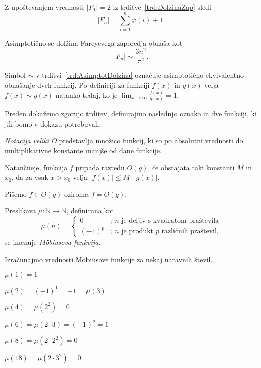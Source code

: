 \documentclass[mat1]{fmfdelo}
\begin{document}
\begin{opomba}
\label{op:AsimptotDolzina}
Z upoštevanjem vrednosti $|F_{1}| = 2$ iz trditve~\ref{trd:DolzinaZap} sledi \[  |F_{n}| = \sum_{i=1}^n \varphi(i) + 1. \]
\end{opomba}

\begin{trditev}
\label{trd:AsimptotDolzina}
Asimptotično se dolžina Fareyevega zaporedja obnaša kot
\[  |F_{n}|\sim\frac{3n^2}{\pi^2}. \]
\end{trditev}

\begin{opomba}
Simbol $\sim$ v trditvi~\ref{trd:AsimptotDolzina} označuje asimptotično ekvivalentno obnašanje dveh funkcij.
Po definiciji za funkciji $f(x)$ in $g(x)$ velja $f(x) \sim g(x)$ natanko tedaj, ko je $ \lim_{x \to \infty} \frac{f(x)}{g(x)} = 1$.
\end{opomba}

%
Preden dokažemo zgornjo trditev, definirajmo naslednjo oznako in dve funkciji, ki jih bomo v dokazu potrebovali.

\begin{definicija}
\emph{Notacija veliki O} predstavlja množico funkcij, ki so po absolutni vrednosti do multiplikativne konstante manjše od dane funkcije.

Natančneje, funkcija $f$ pripada razredu $O(g)$, če obstajata taki konstanti $M$ in $x_{0}$, da za vsak $x > x_{0}$ velja $|f(x)| \leq M \cdot |g(x)|$.

Pišemo $f \in O(g)$ oziroma $f = O(g)$.
\end{definicija}

\begin{definicija}
Preslikava \( \mu\colon \mathbb{N} \to \mathbb{N} \), definirana kot
\[
\mu(n) = \left\{
\begin{array}{rl}
0 & ;\ \mbox{$n$ je deljiv s kvadratom praštevila}\\
(-1)^p & ;\  \mbox{$n$ je produkt $p$ različnih praštevil,}
\end{array}
\right.
\]
se imenuje \emph{M\"obiusova funkcija}.
\end{definicija}

\begin{primer}
Izračunajmo vrednosti M\"obiusove funkcije za nekaj naravnih števil.

\( \mu(1)=1 \)

\( \mu(2)=(-1)^{1}=-1=\mu(3) \)

\( \mu(4)=\mu(2^{2})=0 \)

\( \mu(6)=\mu(2\cdot3)=(-1)^{2}=1 \)

\( \mu(8)=\mu(2\cdot2^{2})=0 \)

\( \mu(18)=\mu(2\cdot3^{2})=0 \)
\end{primer}
\end{document}
